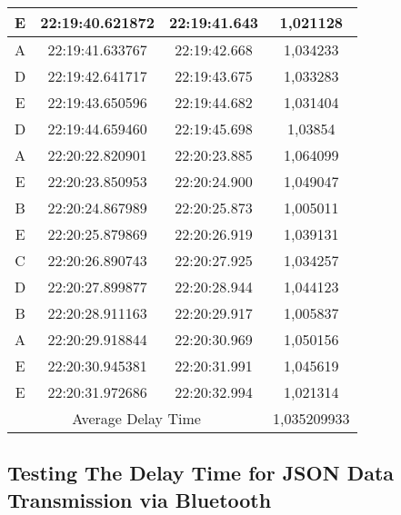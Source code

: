 \begin{table}[!ht]
\begin{tabular}{|ccc|c|}
  \multicolumn{1}{|c|}{E}    & \multicolumn{1}{c|}{22:19:40.621872} & 22:19:41.643       & 1,021128    \\ \hline
  \multicolumn{1}{|c|}{A}    & \multicolumn{1}{c|}{22:19:41.633767} & 22:19:42.668       & 1,034233    \\ \hline
  \multicolumn{1}{|c|}{D}    & \multicolumn{1}{c|}{22:19:42.641717} & 22:19:43.675       & 1,033283    \\ \hline
  \multicolumn{1}{|c|}{E}    & \multicolumn{1}{c|}{22:19:43.650596} & 22:19:44.682       & 1,031404    \\ \hline
  \multicolumn{1}{|c|}{D}    & \multicolumn{1}{c|}{22:19:44.659460} & 22:19:45.698       & 1,03854     \\ \hline
  \multicolumn{1}{|c|}{A}    & \multicolumn{1}{c|}{22:20:22.820901} & 22:20:23.885       & 1,064099    \\ \hline
  \multicolumn{1}{|c|}{E}    & \multicolumn{1}{c|}{22:20:23.850953} & 22:20:24.900       & 1,049047    \\ \hline
  \multicolumn{1}{|c|}{B}    & \multicolumn{1}{c|}{22:20:24.867989} & 22:20:25.873       & 1,005011    \\ \hline
  \multicolumn{1}{|c|}{E}    & \multicolumn{1}{c|}{22:20:25.879869} & 22:20:26.919       & 1,039131    \\ \hline
  \multicolumn{1}{|c|}{C}    & \multicolumn{1}{c|}{22:20:26.890743} & 22:20:27.925       & 1,034257    \\ \hline
  \multicolumn{1}{|c|}{D}    & \multicolumn{1}{c|}{22:20:27.899877} & 22:20:28.944       & 1,044123    \\ \hline
  \multicolumn{1}{|c|}{B}    & \multicolumn{1}{c|}{22:20:28.911163} & 22:20:29.917       & 1,005837    \\ \hline
  \multicolumn{1}{|c|}{A}    & \multicolumn{1}{c|}{22:20:29.918844} & 22:20:30.969       & 1,050156    \\ \hline
  \multicolumn{1}{|c|}{E}    & \multicolumn{1}{c|}{22:20:30.945381} & 22:20:31.991       & 1,045619    \\ \hline
  \multicolumn{1}{|c|}{E}    & \multicolumn{1}{c|}{22:20:31.972686} & 22:20:32.994       & 1,021314    \\ \hline
  \multicolumn{3}{|c|}{Average Delay Time}                                               & 1,035209933 \\ \hline
  \end{tabular}
\end{table}


\subsection{Testing The Delay Time for JSON Data Transmission via Bluetooth}

